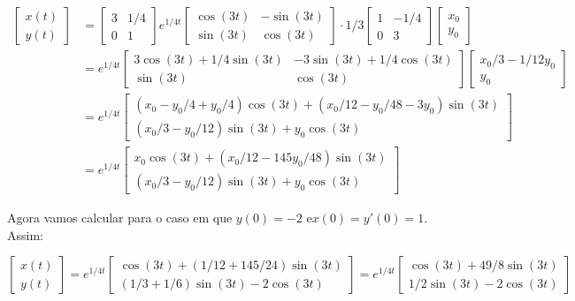 \documentclass[a4paper,12pt]{article}
\theoremstyle{exer}
\theoremstyle{definition}
\begin{document}
\begin{equation}
    \begin{split}
        \begin{bmatrix} x(t) \\ y(t) \end{bmatrix} &= \begin{bmatrix} 3 & 1/4 \\ 0 & 1 \end{bmatrix}e^{1/4t}\begin{bmatrix} \cos(3t) & -\sin(3t) \\ \sin(3t) & \cos(3t) \end{bmatrix}\cdot 1/3\begin{bmatrix} 1 & -1/4 \\ 0 & 3 \end{bmatrix}\begin{bmatrix} x_0 \\ y_0 \end{bmatrix}\\
        &= e^{1/4t}\begin{bmatrix} 3\cos(3t) + 1/4\sin(3t) & -3\sin(3t) + 1/4\cos(3t) \\ \sin(3t) & \cos(3t) \end{bmatrix}\begin{bmatrix} x_0/3 -1/12y_0 \\ y_0 \end{bmatrix} \\
        &= e^{1/4t} \begin{bmatrix} (x_0 - y_0/4 + y_0/4)\cos(3t) + (x_0/12 - y_0/48 - 3y_0)\sin(3t) \\ 
        (x_0/3 - y_0/12)\sin(3t) + y_0\cos(3t)\end{bmatrix} \\
        &= e^{1/4t} \begin{bmatrix} x_0\cos(3t) + (x_0/12 - 145y_0/48)\sin(3t) \\ 
        (x_0/3 - y_0/12)\sin(3t) + y_0\cos(3t)
        \end{bmatrix}
    \end{split}
\end{equation}

Agora vamos calcular para o caso em que $y(0) = -2$ e$ x(0) = y'(0) = 1$. Assim: 

$$
\begin{bmatrix} x(t) \\ y(t) \end{bmatrix} = e^{1/4t}\begin{bmatrix} \cos(3t) + (1/12 + 145/24)\sin(3t) \\ 
(1/3 + 1/6)\sin(3t) - 2\cos(3t) \end{bmatrix} = e^{1/4t}\begin{bmatrix} \cos(3t) + 49/8\sin(3t) \\ 
1/2\sin(3t) - 2\cos(3t) \end{bmatrix}
$$
\end{document}
